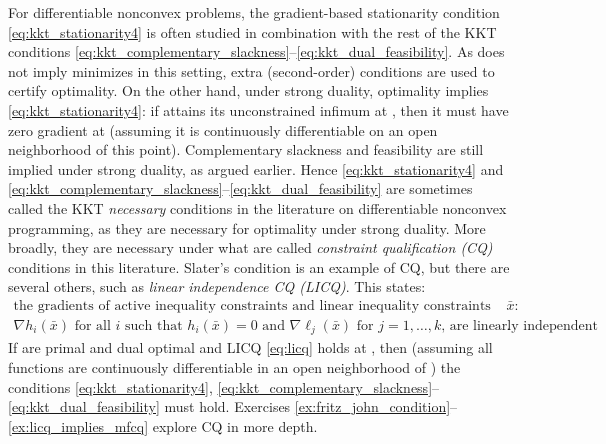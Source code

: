 For differentiable nonconvex problems, the gradient-based stationarity condition
\eqref{eq:kkt_stationarity4} is often studied in combination with the rest of
the KKT conditions
\eqref{eq:kkt_complementary_slackness}--\eqref{eq:kkt_dual_feasibility}. As
 does not imply
 minimizes  in this
setting, extra (second-order) conditions are used to certify optimality. On the
other hand, under strong duality, optimality implies
\eqref{eq:kkt_stationarity4}: if  attains
its unconstrained infimum at , then it must have zero gradient
at  (assuming it is continuously differentiable on an open
neighborhood of this point). Complementary slackness and feasibility are still
implied under strong duality, as argued earlier. Hence
\eqref{eq:kkt_stationarity4} and
\eqref{eq:kkt_complementary_slackness}--\eqref{eq:kkt_dual_feasibility} are
sometimes called the KKT \emph{necessary} conditions in the literature on
differentiable nonconvex programming, as they are necessary for optimality under
strong duality. More broadly, they are necessary under what are called
\emph{constraint qualification (CQ)} conditions in this literature. Slater's
condition is an example of CQ, but there are several others, such as
\emph{linear independence CQ (LICQ)}. This states:   
\begin{multline}
\label{eq:licq} 
\text{the gradients of active inequality constraints and linear
  inequality constraints at $\bar{x}$:} \\ \text{$\nabla h_i(\bar{x})$ for all 
  $i$ such that $h_i(\bar{x}) = 0$ and $\nabla \ell_j(\bar{x})$ for $j =
  1,\dots,k$, are linearly independent}.   
\end{multline}
If  are primal and dual optimal and LICQ
\eqref{eq:licq} holds at , then (assuming all functions are
continuously differentiable in an open neighborhood of ) the
conditions \eqref{eq:kkt_stationarity4},
\eqref{eq:kkt_complementary_slackness}--\eqref{eq:kkt_dual_feasibility} must
hold. Exercises \ref{ex:fritz_john_condition}--\ref{ex:licq_implies_mfcq}
explore CQ in more depth.


